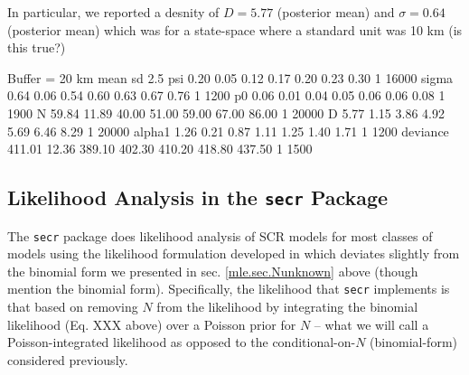 In particular, we reported a desnity of $D=5.77$ (posterior mean) and
$\sigma = 0.64$ (posterior mean) which was for a state-space where a
standard unit was 10 km (is this true?) 

Buffer = 20 km
           mean    sd   2.5%
psi        0.20  0.05   0.12   0.17   0.20   0.23   0.30    1 16000
sigma      0.64  0.06   0.54   0.60   0.63   0.67   0.76    1  1200
p0         0.06  0.01   0.04   0.05   0.06   0.06   0.08    1  1900
N         59.84 11.89  40.00  51.00  59.00  67.00  86.00    1 20000
D          5.77  1.15   3.86   4.92   5.69   6.46   8.29    1 20000
alpha1     1.26  0.21   0.87   1.11   1.25   1.40   1.71    1  1200
deviance 411.01 12.36 389.10 402.30 410.20 418.80 437.50    1  1500




\begin{comment}
As an
exercise, run this analysis for 30 and 40 km buffers and compare those
found in section 4.6 under {\bf WinBUGS}.  
NOTE: The function \mbox{\tt
  secr.fit} 
will return a
warning when the buffer size appears to be too small.  This is useful
particularly with the different units being used between programs and
packages.
\end{comment}

\subsection{Likelihood Analysis in the \mbox{\tt secr} Package}

The \mbox{\tt secr} package does likelihood analysis of SCR models for most
classes of models using the likelihood formulation developed in 
\citep{borchers_efford:2008} which 
deviates slightly from the binomial form we presented in sec.
\ref{mle.sec.Nunknown} above (though \citet{borchers_efford:2008}
mention the binomial form).
Specifically, the likelihood that \mbox{\tt secr} implements is that based on removing
$N$ from the likelihood by integrating the binomial likelihood
(Eq. XXX above) over a Poisson prior for $N$ -- what we will call a
Poisson-integrated likelihood as opposed to the 
conditional-on-$N$ (binomial-form) considered previously. 

